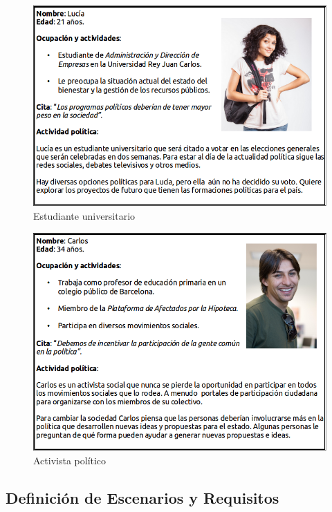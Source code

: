 	\begin{figure}[!]
      \centering
	\includegraphics[keepaspectratio, scale=0.45]{Media/Captures/person1.png}
      \caption{Estudiante universitario}
      \label{fig:studentPerson}
    \end{figure}
    
	\begin{figure}[!]
      \centering
	\includegraphics[keepaspectratio, scale=0.45]{Media/Captures/person2.png}
      \caption{Activista político}
      \label{fig:activistPerson}
    \end{figure}


\subsection{Definición de Escenarios y Requisitos}

